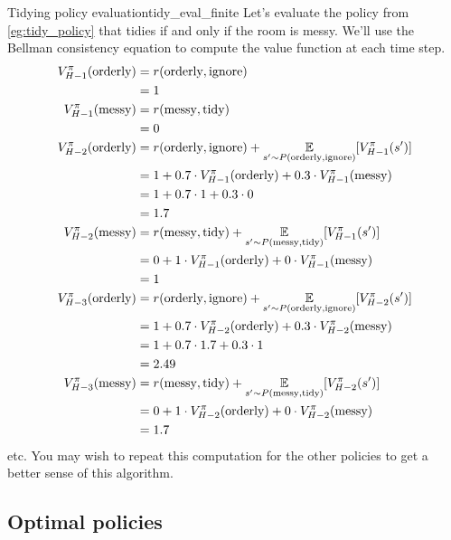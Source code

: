 \documentclass[../main/main]{subfiles}
\begin{document}
\begin{example}{Tidying policy evaluation}{tidy_eval_finite}
    Let's evaluate the policy from \ref{eg:tidy_policy} that tidies if and only if the room is messy. We'll use the Bellman consistency equation to compute the value function at each time step.
    \begin{align*}
        V_{H-1}^\pi(\text{orderly}) &= r(\text{orderly}, \text{ignore}) \\
        &= 1 \\
        V_{H-1}^\pi(\text{messy}) &= r(\text{messy}, \text{tidy}) \\
        &= 0 \\
        V_{H-2}^\pi(\text{orderly}) &= r(\text{orderly}, \text{ignore}) + \operatorname*{\mathbb{E}}_{s' \sim P(\text{orderly}, \text{ignore})} [V_{H-1}^\pi(s')] \\
        &= 1 + 0.7 \cdot V_{H-1}^{\pi}(\text{orderly}) + 0.3 \cdot V_{H-1}^{\pi}(\text{messy}) \\
        &= 1 + 0.7 \cdot 1 + 0.3 \cdot 0 \\
        &= 1.7 \\
        V_{H-2}^\pi(\text{messy}) &= r(\text{messy}, \text{tidy}) + \operatorname*{\mathbb{E}}_{s' \sim P(\text{messy}, \text{tidy})} [V_{H-1}^\pi(s')] \\
        &= 0 + 1 \cdot V_{H-1}^{\pi}(\text{orderly}) + 0 \cdot V_{H-1}^{\pi}(\text{messy}) \\
        &= 1 \\
        V_{H-3}^\pi(\text{orderly}) &= r(\text{orderly}, \text{ignore}) + \operatorname*{\mathbb{E}}_{s' \sim P(\text{orderly}, \text{ignore})} [V_{H-2}^\pi(s')] \\
        &= 1 + 0.7 \cdot V_{H-2}^{\pi}(\text{orderly}) + 0.3 \cdot V_{H-2}^{\pi}(\text{messy}) \\
        &= 1 + 0.7 \cdot 1.7 + 0.3 \cdot 1 \\
        &= 2.49 \\
        V_{H-3}^\pi(\text{messy}) &= r(\text{messy}, \text{tidy}) + \operatorname*{\mathbb{E}}_{s' \sim P(\text{messy}, \text{tidy})} [V_{H-2}^\pi(s')] \\
        &= 0 + 1 \cdot V_{H-2}^{\pi}(\text{orderly}) + 0 \cdot V_{H-2}^{\pi}(\text{messy}) \\
        &= 1.7
    \end{align*}
    etc. You may wish to repeat this computation for the other policies to get a better sense of this algorithm.
\end{example}

\subsection{Optimal policies}
\end{document}
